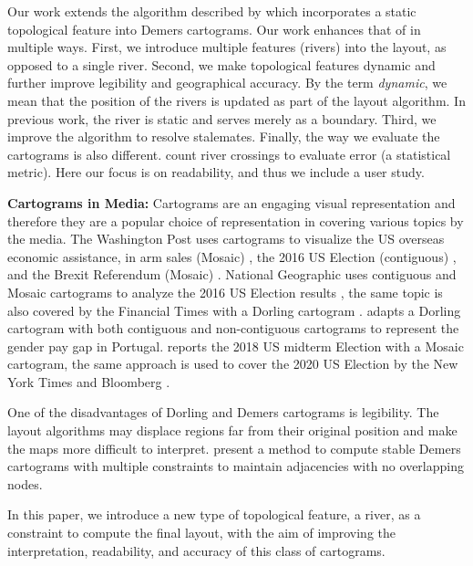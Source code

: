 \documentclass[Afour,sagev,times]{sagej}
\newcommand{\bobgraph}[1]{\noindent\textbf{#1}}
\begin{document}
Our work extends the algorithm described by \citet{tong2018Cartograms} which incorporates a static topological feature into Demers cartograms.
Our work enhances that of \citet{tong2018Cartograms} in multiple ways.
First, we introduce multiple features (rivers) into the layout, as opposed to a single river.
Second, we make topological features dynamic and further improve legibility and geographical accuracy.
By the term \textit{dynamic}, we mean that the position of the rivers is updated as part of the layout algorithm.
In previous work, the river is static and serves merely as a boundary.
Third, we improve the algorithm to resolve stalemates.
Finally, the way we evaluate the cartograms is also different.
\citet{tong2018Cartograms} count river crossings to evaluate error (a statistical metric).
Here our focus is on readability, and thus we include a user study.

\bobgraph{Cartograms in Media: }Cartograms are an engaging visual representation and therefore they are a popular choice of representation in covering various topics by the media.
The Washington Post uses cartograms to visualize the US overseas economic assistance, in arm sales (Mosaic) \cite{bearak2016Everything}, the 2016 US Election (contiguous) \cite{gamio2016Election}, and the Brexit Referendum (Mosaic) \cite{taylor2016What}.
National Geographic uses contiguous and Mosaic cartograms to analyze the 2016 US Election results \cite{miller2016Election}, the same topic is also covered by the Financial Times with a Dorling cartogram \cite{stabe2016Search}.
\citet{cruz2017Adapted} adapts a Dorling cartogram with both contiguous and non-contiguous cartograms to represent the gender pay gap in Portugal.
\citet{sandberg2018Cartogram} reports the 2018 US midterm Election with a Mosaic cartogram, the same approach is used to cover the 2020 US Election by the New York Times \cite{thelearningnetwork2020What} and Bloomberg \cite{mccartney20202020}.

One of the disadvantages of Dorling and Demers cartograms is legibility.
The layout algorithms may displace regions far from their original position and make the maps more difficult to interpret.
\citet{nickel2022Multicriteria} present a method to compute stable Demers cartograms with multiple constraints to maintain adjacencies with no overlapping nodes.

In this paper, we introduce a new type of topological feature, a river, as a constraint to compute the final layout, with the aim of improving the interpretation, readability, and accuracy of this class of cartograms.
\end{document}
